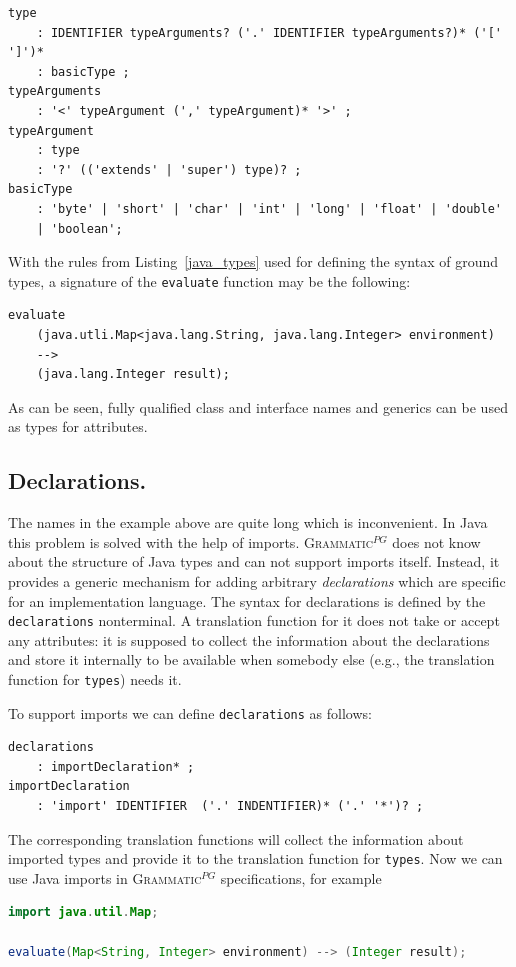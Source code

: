 \documentclass{informat} %
\newcommand{\lstref}[1]{Listing~\ref{#1}}
\newcommand{\ATF}{\textsc{Grammatic}$^{PG}$}
\begin{document}
\begin{lstlisting}[caption=Ground type syntax for Java 5,float=htbp,label=java_types]
type
	: IDENTIFIER typeArguments? ('.' IDENTIFIER typeArguments?)* ('[' ']')*
	: basicType ;
typeArguments
	: '<' typeArgument (',' typeArgument)* '>' ;
typeArgument
	: type
	: '?' (('extends' | 'super') type)? ;
basicType
	: 'byte' | 'short' | 'char' | 'int' | 'long' | 'float' | 'double' 
	| 'boolean';
\end{lstlisting}


With the rules from \lstref{java_types} used for defining the syntax of ground types, a signature of the \texttt{evaluate} function may be the following:
\begin{lstlisting}
evaluate
	(java.utli.Map<java.lang.String, java.lang.Integer> environment) 
	--> 
	(java.lang.Integer result);
\end{lstlisting}
As can be seen, fully qualified class and interface names and generics can be used as types for attributes. 

\subsection{Declarations.}

The names in the example above are quite long which is inconvenient. In Java this problem is solved with the help of imports. \ATF{} does not know about the structure of Java types and can not support imports itself. Instead, it provides a generic mechanism for adding arbitrary \emph{declarations} which are specific for an implementation language. The syntax for declarations is defined by the \texttt{declarations} nonterminal. A translation function for it does not take or accept any attributes: it is supposed to collect the information about the declarations and store it internally to be available when somebody else (e.g., the translation function for \texttt{types}) needs it.

To support imports we can define \texttt{declarations} as follows:
\begin{lstlisting}
declarations
	: importDeclaration* ;
importDeclaration
	: 'import' IDENTIFIER  ('.' INDENTIFIER)* ('.' '*')? ;
\end{lstlisting}
The corresponding translation functions will collect the information about imported types and provide it to the translation function for \texttt{types}. Now we can use Java imports in \ATF{} specifications, for example
\begin{lstlisting}[language=Java]
import java.util.Map;

evaluate(Map<String, Integer> environment) --> (Integer result);
\end{lstlisting}
 
\end{document}
